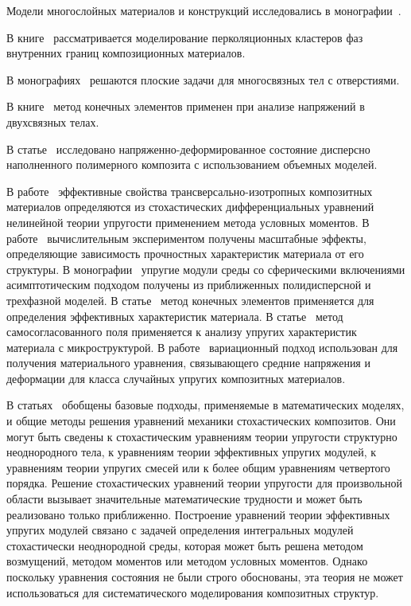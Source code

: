 Модели многослойных материалов и конструкций исследовались в монографии~\cite{Bolotin}.

В книге~\cite{Gerega} рассматривается моделирование перколяционных кластеров фаз внутренних границ композиционных материалов.

В монографиях~\cite{Grigoliuk, Savin} решаются плоские задачи для многосвязных тел с отверстиями.

В книге~\cite{Erzhanov} метод конечных элементов применен при анализе напряжений в двухсвязных телах.

В статье~\cite{Zharkov} исследовано напряженно-деформированное состояние дисперсно наполненного полимерного композита с использованием объемных моделей.

В работе~\cite{Nazarenko} эффективные свойства трансверсально-изотропных композитных материалов определяются из стохастических дифференциальных уравнений нелинейной теории упругости применением метода условных моментов. В работе~\cite{Ilinikh} вычислительным экспериментом получены масштабные эффекты, определяющие зависимость прочностных характеристик материала от его структуры. В монографии~\cite{Bolshakov} упругие модули среды со сферическими включениями асимптотическим подходом получены из приближенных полидисперсной и трехфазной моделей. В статье~\cite{Michel} метод конечных элементов применяется для определения эффективных характеристик материала. В статье~\cite{Duan} метод самосогласованного поля применяется к анализу упругих характеристик материала с микроструктурой. В работе~\cite{Drugan} вариационный подход использован для получения материального уравнения, связывающего средние напряжения и деформации для класса случайных упругих композитных материалов.

В статьях~\cite{Khoroshun2000-1, Khoroshun2000-2, Scalon, Trias} обобщены базовые подходы, применяемые в математических моделях, и общие методы решения уравнений механики стохастических композитов. Они могут быть сведены к стохастическим уравнениям теории упругости структурно неоднородного тела, к уравнениям теории эффективных упругих модулей, к уравнениям теории упругих смесей или к более общим уравнениям четвертого порядка. Решение стохастических уравнений теории упругости для произвольной области вызывает значительные математические трудности и может быть реализовано только приближенно. Построение уравнений теории эффективных упругих модулей связано с задачей определения интегральных модулей стохастически неоднородной среды, которая может быть решена методом возмущений, методом моментов или методом условных моментов. Однако поскольку уравнения состояния не были строго обоснованы, эта теория не может использоваться для систематического моделирования композитных структур.

